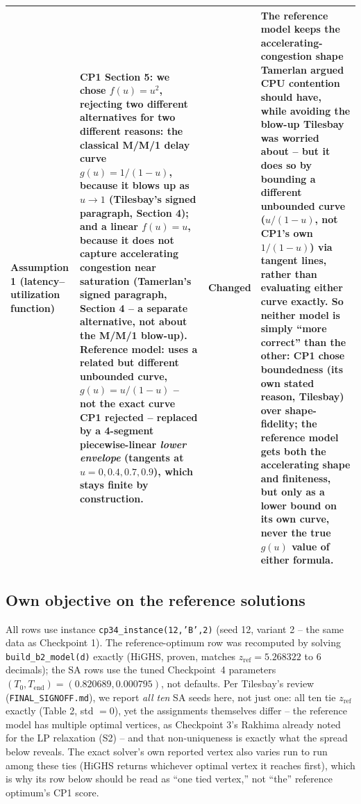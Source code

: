 \documentclass[11pt,a4paper]{article}
\newcommand{\zref}{z_{\mathrm{ref}}}
\begin{document}
{\begin{tabularx}{\textwidth}{@{}p{2.6cm}Xp{1.7cm}X@{}}
Assumption 1 (latency--utilization function) & CP1 Section 5: we chose $f(u)=u^2$, rejecting two different alternatives for two different reasons: the classical M/M/1 delay curve $g(u)=1/(1-u)$, because it blows up as $u\to1$ (Tilesbay's signed paragraph, Section 4); and a linear $f(u)=u$, because it does not capture accelerating congestion near saturation (Tamerlan's signed paragraph, Section 4 -- a separate alternative, not about the M/M/1 blow-up). Reference model: uses a related but different unbounded curve, $g(u)=u/(1-u)$ -- not the exact curve CP1 rejected -- replaced by a 4-segment piecewise-linear \emph{lower envelope} (tangents at $u=0,0.4,0.7,0.9$), which stays finite by construction. & Changed & The reference model keeps the accelerating-congestion shape Tamerlan argued CPU contention should have, while avoiding the blow-up Tilesbay was worried about -- but it does so by bounding a different unbounded curve ($u/(1-u)$, not CP1's own $1/(1-u)$) via tangent lines, rather than evaluating either curve exactly. So neither model is simply ``more correct'' than the other: CP1 chose boundedness (its own stated reason, Tilesbay) over shape-fidelity; the reference model gets both the accelerating shape and finiteness, but only as a lower bound on its own curve, never the true $g(u)$ value of either formula.\\
\bottomrule
\end{tabularx}}

\subsection*{Own objective on the reference solutions}
All rows use instance \texttt{cp34\_instance(12,'B',2)} (seed 12, variant 2 -- the same data as Checkpoint 1). The reference-optimum row was recomputed by solving \texttt{build\_b2\_model(d)} exactly (HiGHS, proven, matches $\zref=5.268322$ to 6 decimals); the SA rows use the tuned Checkpoint~4 parameters $(T_0,T_{\mathrm{end}})=(0.820689,0.000795)$, not defaults. Per Tilesbay's review (\texttt{FINAL\_SIGNOFF.md}), we report \emph{all ten} SA seeds here, not just one: all ten tie $\zref$ exactly (Table 2, std $=0$), yet the assignments themselves differ -- the reference model has multiple optimal vertices, as Checkpoint 3's Rakhima already noted for the LP relaxation (S2) -- and that non-uniqueness is exactly what the spread below reveals. The exact solver's own reported vertex also varies run to run among these ties (HiGHS returns whichever optimal vertex it reaches first), which is why its row below should be read as ``one tied vertex,'' not ``the'' reference optimum's CP1 score.
\end{document}
